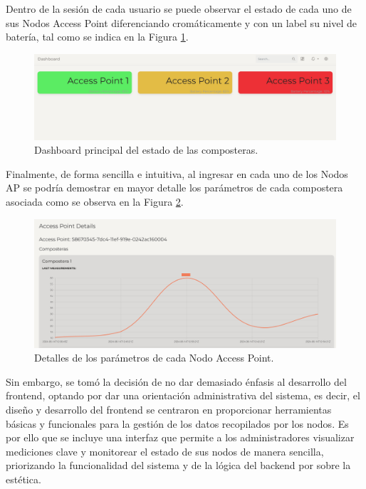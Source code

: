 Dentro de la sesión de cada usuario se puede observar el estado de cada uno de sus Nodos Access Point diferenciando cromáticamente y con un label su nivel de batería, tal como se indica en la Figura \ref{fig:Dash}. 

\begin{figure}[H]
	\centering
	\includegraphics[scale=.3]{./Figures/PortalWeb/Dashboard-composteras.jpeg}
	\caption{Dashboard principal del estado de las composteras.}
	\label{fig:Dash}
\end{figure}

Finalmente, de forma sencilla e intuitiva, al ingresar en cada uno de los Nodos AP se podría demostrar en mayor detalle los parámetros de cada compostera asociada como se observa en la Figura \ref{fig:web-detalles-nodoAP}. 

\begin{figure}[H]
    \centering
    \includegraphics[scale=0.35]{./Figures/PortalWeb/Detalles-compsotera.jpeg}
	\caption{Detalles de los parámetros de cada Nodo Access Point.}
 \label{fig:web-detalles-nodoAP}
\end{figure}

Sin embargo, se tomó la decisión de no dar demasiado énfasis al desarrollo del frontend, optando por dar una orientación administrativa del sistema, es decir, el diseño y desarrollo del frontend se centraron en proporcionar herramientas básicas y funcionales para la gestión de los datos recopilados por los nodos. Es por ello que se incluye una interfaz que permite a los administradores visualizar mediciones clave y monitorear el estado de sus nodos de manera sencilla, priorizando la funcionalidad del sistema y de la lógica del backend por sobre la estética.


